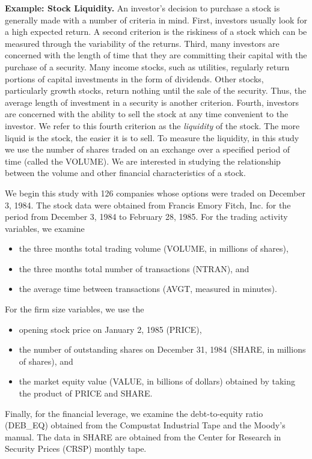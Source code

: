 \textbf{Example: Stock Liquidity.} An
investor's decision to purchase a stock is generally made with a
number of criteria in mind. First, investors usually look for a high
expected return. A second criterion is the riskiness of a stock
which can be measured through the variability of the returns. Third,
many investors are concerned with the length of time that they are
committing their capital with the purchase of a security. Many
income stocks, such as utilities, regularly return portions of
capital investments in the form of dividends. Other stocks,
particularly growth stocks, return nothing until the sale of the
security. Thus, the average length of investment in a security is
another criterion. Fourth, investors are concerned with the ability
to sell the stock at any time convenient to the investor. We refer
to this fourth criterion as the \textit{liquidity }of the stock. The
more liquid is the stock, the easier it is to sell. To measure the
liquidity, in this study we use the number of shares traded on an
exchange over a specified period of time (called the VOLUME). We are
interested in studying the relationship between the volume and other
financial characteristics of a stock.

We begin this study with 126 companies whose options were traded on December
3, 1984. The stock data were obtained from Francis Emory Fitch, Inc. for the
period from December 3, 1984 to February 28, 1985. For the trading activity
variables, we examine
\begin{itemize}
\item the three months total trading volume (VOLUME, in millions of shares),
\item the three months total number of transactions (NTRAN), and
\item the average time between transactions (AVGT, measured in minutes).
\end{itemize}
\noindent For the firm size variables, we use the
\begin{itemize}
\item opening stock price on January 2, 1985 (PRICE),
\item  the number of outstanding shares on December 31, 1984 (SHARE, in millions of shares), and
\item  the market equity value (VALUE, in billions of dollars) obtained by taking the product of PRICE and SHARE.
\end{itemize}
\noindent Finally, for the financial leverage, we examine the
debt-to-equity ratio (DEB\_EQ) obtained from the Compustat
Industrial Tape and the Moody's manual. The data in SHARE are
obtained from the Center for Research in Security Prices (CRSP)
monthly tape.

